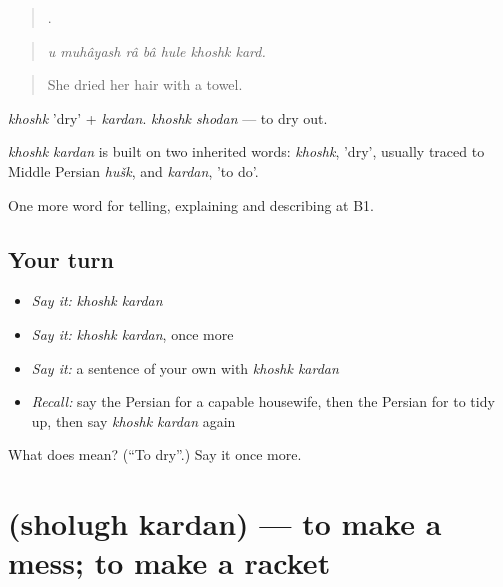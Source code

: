\begin{quote}
      .
\end{quote}

\begin{quote}
\emph{u muhâyash râ bâ hule khoshk kard.}
\end{quote}

\begin{quote}
She dried her hair with a towel.
\end{quote}

\emph{khoshk} 'dry' + \emph{kardan}. \emph{khoshk shodan} — to dry out.

\begin{cousinweb}
\emph{khoshk kardan} is built on two inherited words: \emph{khoshk}, 'dry', usually traced to Middle Persian \emph{hušk}, and \emph{kardan}, 'to do'.
\end{cousinweb}

\begin{grammarlens}[title={What you've built}]
One more word for telling, explaining and describing at B1.
\end{grammarlens}

\subsection*{Your turn}
\begin{itemize}
\raggedright
  \item \emph{Say it:} \emph{khoshk kardan}
  \item \emph{Say it:} \emph{khoshk kardan}, once more
  \item \emph{Say it:} a sentence of your own with \emph{khoshk kardan}
  \item \emph{Recall:} say the Persian for a capable housewife, then the Persian for to tidy up, then say \emph{khoshk kardan} again
\end{itemize}

\begin{tcolorbox}[breakable,colback=teal!4,colframe=teal!35!black,title={Before you move on}]
What does   mean? (\textquotedblleft{}To dry\textquotedblright{}.) Say it once more.
\end{tcolorbox}
\section[\texorpdfstring{\fa{شلوغ} \fa{کردن} (sholugh kardan)}{شلوغ کردن (sholugh kardan)}]{  (sholugh kardan) — to make a mess; to make a racket}

